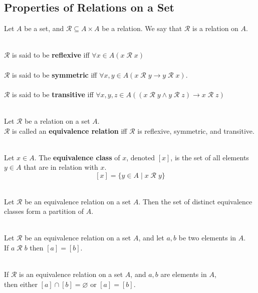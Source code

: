 \documentclass[12pt]{article}
\begin{document}
\subsection{Properties of Relations on a Set}
Let $A$ be a set, and $\mathcal{R} \subseteq A \times A$ be a relation. We say that $\mathcal{R}$ is a relation on $A$.
\begin{definition}
\hfill\\
\normalfont $\mathcal{R}$ is said to be \textbf{reflexive} iff $\forall x\in A (x\;\mathcal{R}\;x)$\\\\
$\mathcal{R}$ is said to be \textbf{symmetric} iff $\forall x,y\in A(x\;\mathcal{R}\;y\rightarrow y\;\mathcal{R}\;x)$.\\\\
$\mathcal{R}$ is said to be \textbf{transitive} iff $\forall x,y,z\in A((x\;\mathcal{R}\;y\land y\;\mathcal{R}\;z)\rightarrow x\;\mathcal{R}\;z)$
\end{definition} 
\begin{definition}
\hfill\\
\normalfont Let $\mathcal{R}$ be a relation on a set $A$.\\
$\mathcal{R}$ is called an \textbf{equivalence relation} iff $\mathcal{R}$ is reflexive, symmetric, and transitive.
\end{definition}
\begin{definition}
\hfill\\
\normalfont Let $x\in A$. The \textbf{equivalence class} of $x$, denoted $[x]$, is the set of all elements $y\in A$ that are in relation with $x$.
\[
[x]=\{y\in A\mid x\;\mathcal{R}\;y\}
\]
\end{definition}
\begin{theorem}[8.3.4(Epp)]
\hfill\\
\normalfont Let $\mathcal{R}$ be an equivalence relation on a set $A$. Then the set of distinct equivalence classes form a partition of $A$.
\end{theorem}
\begin{lemma}[8.3.2(Epp)]
\hfill\\
\normalfont Let $\mathcal{R}$ be an equivalence relation on a set $A$, and let $a,b$ be two elements in $A$.\\
If $a\;\mathcal{R}\;b$ then $[a]=[b]$.
\end{lemma}
\begin{lemma}[8.3.3(Epp)]
\hfill\\
\normalfont If $\mathcal{R}$ is an equivalence relation on a set $A$, and $a,b$ are elements in $A$,\\
then either $[a]\cap[b]=\varnothing$ or $[a]=[b]$.
\end{lemma}
\end{document}
